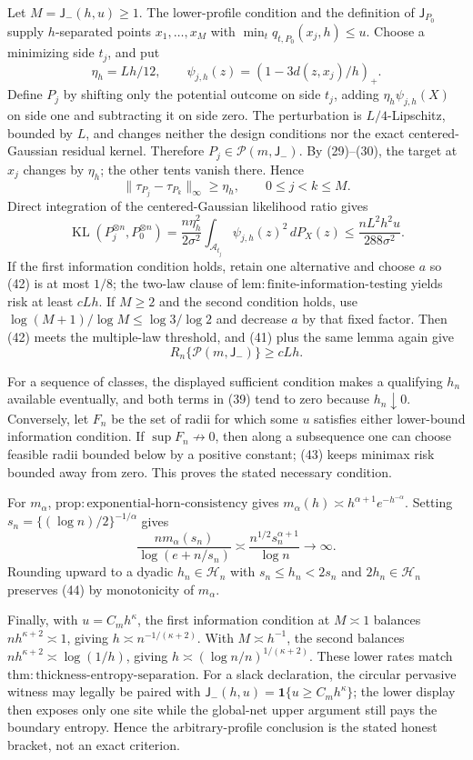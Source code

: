 Let \(M=\mathsf J_-(h,u)\ge1\).  The lower-profile condition and the definition of \(\mathsf J_{P_0}\) supply \(h\)-separated points \(x_1,\ldots,x_M\) with \(\min_tq_{t,P_0}(x_j,h)\le u\).  Choose a minimizing side \(t_j\), and put
\[
 \eta_h=Lh/12,\qquad \psi_{j,h}(z)=(1-3d(z,x_j)/h)_+. \tag{40}
\]
Define \(P_j\) by shifting only the potential outcome on side \(t_j\), adding \(\eta_h\psi_{j,h}(X)\) on side one and subtracting it on side zero.  The perturbation is \(L/4\)-Lipschitz, bounded by \(L\), and changes neither the design conditions nor the exact centered-Gaussian residual kernel.  Therefore \(P_j\in\mathcal P(m,\mathsf J_-)\).  By (29)--(30), the target at \(x_j\) changes by \(\eta_h\); the other tents vanish there.  Hence
\[
 \|\tau_{P_j}-\tau_{P_k}\|_\infty\ge\eta_h,\qquad0\le j<k\le M. \tag{41}
\]
Direct integration of the centered-Gaussian likelihood ratio gives
\[
 \operatorname{KL}(P_j^{\otimes n},P_0^{\otimes n})
 =\frac{n\eta_h^2}{2\sigma^2}\int_{\mathcal A_{t_j}}\psi_{j,h}(z)^2\,dP_X(z)
 \le\frac{nL^2h^2u}{288\sigma^2}. \tag{42}
\]
If the first information condition holds, retain one alternative and choose \(a\) so (42) is at most \(1/8\); the two-law clause of \(\mathrm{lem:finite\text{-}information\text{-}testing}\) yields risk at least \(cLh\).  If \(M\ge2\) and the second condition holds, use \(\log(M+1)/\log M\le\log3/\log2\) and decrease \(a\) by that fixed factor.  Then (42) meets the multiple-law threshold, and (41) plus the same lemma again give
\[
 R_n\{\mathcal P(m,\mathsf J_-)\}\ge cLh. \tag{43}
\]

For a sequence of classes, the displayed sufficient condition makes a qualifying \(h_n\) available eventually, and both terms in (39) tend to zero because \(h_n\downarrow0\).  Conversely, let \(F_n\) be the set of radii for which some \(u\) satisfies either lower-bound information condition.  If \(\sup F_n\not\to0\), then along a subsequence one can choose feasible radii bounded below by a positive constant; (43) keeps minimax risk bounded away from zero.  This proves the stated necessary condition.

For \(m_\alpha\), \(\mathrm{prop:exponential\text{-}horn\text{-}consistency}\) gives \(m_\alpha(h)\asymp h^{\alpha+1}e^{-h^{-\alpha}}\).  Setting \(s_n=\{(\log n)/2\}^{-1/\alpha}\) gives
\[
 \frac{nm_\alpha(s_n)}{\log(e+n/s_n)}
 \asymp\frac{n^{1/2}s_n^{\alpha+1}}{\log n}\longrightarrow\infty. \tag{44}
\]
Rounding upward to a dyadic \(h_n\in\mathcal H_n\) with \(s_n\le h_n<2s_n\) and \(2h_n\in\mathcal H_n\) preserves (44) by monotonicity of \(m_\alpha\).

Finally, with \(u=C_mh^\kappa\), the first information condition at \(M\asymp1\) balances \(nh^{\kappa+2}\asymp1\), giving \(h\asymp n^{-1/(\kappa+2)}\).  With \(M\asymp h^{-1}\), the second balances \(nh^{\kappa+2}\asymp\log(1/h)\), giving \(h\asymp(\log n/n)^{1/(\kappa+2)}\).  These lower rates match \(\mathrm{thm:thickness\text{-}entropy\text{-}separation}\).  For a slack declaration, the circular pervasive witness may legally be paired with \(\mathsf J_-(h,u)=\mathbf1\{u\ge C_mh^\kappa\}\); the lower display then exposes only one site while the global-net upper argument still pays the boundary entropy.  Hence the arbitrary-profile conclusion is the stated honest bracket, not an exact criterion.